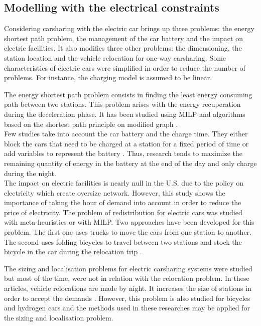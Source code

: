 \begin{bibunit}[ieeetr]
\subsection{Modelling with the electrical constraints}
Considering carsharing with the electric car brings up three problems: the energy shortest path problem, the management of the car battery and the impact on electric facilities.
It also modifies three other problems: the dimensioning, the station location and the vehicle relocation for one-way carsharing.
Some characteristics of electric cars were simplified in order to reduce the number of problems.
For instance, the charging model is assumed to be linear.

The energy shortest path problem consists in finding the least energy consuming path between two stations.
This problem arises with the energy recuperation during the deceleration phase.
It has been studied using MILP \cite{touati_combinatorial_2012} and algorithms based on the shortest path principle on modified graph \cite{artmeier_optimal_2010}.\\
Few studies take into account the car battery and the charge time.
They either block the cars that need to be charged at a station for a fixed period of time \cite{boyaci_optimization_2015} or add variables to represent the battery \cite{bruglieri_vehicle_2014}.
Thus, research tends to maximize the remaining quantity of energy in the battery at the end of the day and only charge during the night.\\
The impact on electric facilities is nearly null in the U.S. due to the policy on electricity which create oversize network\cite{liu_survey_2011}.
However, this study shows the importance of taking the hour of demand into account in order to reduce the price of electricity. 
The problem of redistribution for electric cars was studied with meta-heuristics or with MILP.
Two approaches have been developed for this problem.
The first one uses trucks to move the cars from one station to another.
The second uses folding bicycles to travel between two stations and stock the bicycle in the car during the relocation trip \cite{bruglieri_vehicle_2014}.

The sizing and localisation problems for electric carsharing systems were studied but most of the time, were not in relation with the relocation problem.
In these articles, vehicle relocations are made by night.
It increases the size of stations in order to accept the demands \cite{correia_optimization_2012}.
However, this problem is also studied for bicycles \cite{george_fleet_2011} and hydrogen cars \cite{melaina_initiating_2003} and the methods used in these researches may be applied for the sizing and localisation problem.


\end{bibunit}
